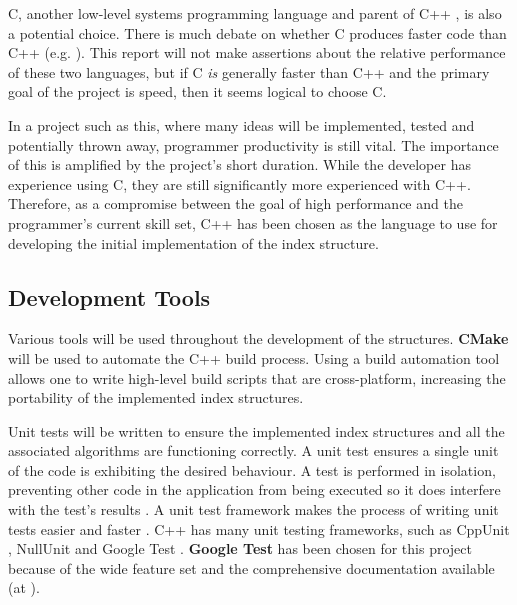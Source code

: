 C, another low-level systems programming language \cite{c-lang} and parent of C++ \cite{cpp}, is also a potential choice. There is much debate on whether C produces faster code than C++ (e.g. \cite{c-vs-cpp1, c-vs-cpp2, c-vs-cpp3}). This report will not make assertions about the relative performance of these two languages, but if C \textit{is} generally faster than C++ and the primary goal of the project is speed, then it seems logical to choose C.

In a project such as this, where many ideas will be implemented, tested and potentially thrown away, programmer productivity is still vital. The importance of this is amplified by the project's short duration. While the developer has experience using C, they are still significantly more experienced with C++. Therefore, as a compromise between the goal of high performance and the programmer's current skill set, C++ has been chosen as the language to use for developing the initial implementation of the index structure. 

\subsection{Development Tools}
\label{sec:development-tools}

Various tools will be used throughout the development of the structures. \textbf{CMake} \cite{cmake} will be used to automate the C++ build process. Using a build automation tool allows one to write high-level build scripts that are cross-platform, increasing the portability of the implemented index structures.

Unit tests will be written to ensure the implemented index structures and all the associated algorithms are functioning correctly. A unit test ensures a single unit of the code is exhibiting the desired behaviour. A test is performed in isolation, preventing other code in the application from being executed so it does interfere with the test's results \cite{automated-defect-prevention}. A unit test framework makes the process of writing unit tests easier and faster \cite{unit-test-frameworks}. C++ has many unit testing frameworks, such as CppUnit \cite{cppunit}, NullUnit \cite{nullunit} and Google Test \cite{google-test}. \textbf{Google Test} has been chosen for this project because of the wide feature set and the comprehensive documentation available (at \cite{google-test}).

